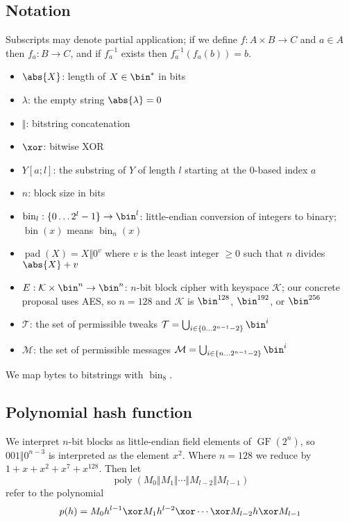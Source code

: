 \documentclass[letterpaper,11pt]{article}
\newcommand*{\Concat}{\Vert}
\DeclareMathOperator{\fromint}{bin}
\DeclareMathOperator{\GF}{GF}
\DeclareMathOperator{\pad}{pad}
\DeclareMathOperator{\poly}{poly}
\begin{document}
\subsection{Notation}
Subscripts may denote partial application; if we define $f: A \times B \rightarrow C$ and
$a \in A$ then $f_a: B \rightarrow C$, and if $f_a^{-1}$ exists then $f_a^{-1}(f_a(b)) = b$.
\begin{itemize}
    \item $\abs{X}$: length of $X \in \bin^{*}$ in bits
    \item $\lambda$: the empty string $\abs{\lambda} = 0$
    \item $\Concat$: bitstring concatenation
    \item \(\xor\): bitwise XOR
    \item $Y[a;l]$: the substring of $Y$ of length $l$ starting at the 0-based index $a$
    \item \(n\): block size in bits
    \item $\fromint_l: \{0 \ldots 2^l-1\} \rightarrow \bin^l$:
    little-endian conversion of integers to binary; 
    \(\fromint(x)\) means \(\fromint_n(x)\)
    \item $\pad(X) = X \Concat 0^v$
    where $v$ is the least integer $\geq 0$ such that $n$ divides $\abs{X} + v$
    \item \(E: \mathcal{K} \times \bin^n \rightarrow \bin^n\): 
    \(n\)-bit block cipher with keyspace \(\mathcal{K}\);
    our concrete proposal uses AES, so \(n=128\) and \(\mathcal{K}\) is
    \(\bin^{128}\), \(\bin^{192}\), or \(\bin^{256}\)
    \item \(\mathcal{T}\): the set of permissible tweaks
    \(\mathcal{T} = \bigcup_{i \in \{0\ldots2^{n-1}-2\}}\bin^i\)
    \item \(\mathcal{M}\): the set of permissible messages
    \(\mathcal{M} = \bigcup_{i \in \{n\ldots2^{n-1}-2\}}\bin^i\)
\end{itemize}
We map bytes to bitstrings with \(\fromint_8\).

\subsection{Polynomial hash function}
We interpret \(n\)-bit blocks as little-endian field elements of \(\GF(2^n)\),
so \(001 \Concat 0^{n-3}\) is interpreted as the element \(x^2\).
Where \(n=128\) we reduce by
\(1 + x + x^2 + x^7 + x^{128}\). Then let
\begin{displaymath}
    \poly(M_0 \Concat M_1 \Concat \cdots \Concat M_{l-2} \Concat M_{l-1})
\end{displaymath}
refer to the polynomial
\begin{displaymath}
    p(h) = M_0h^{l-1} \xor M_1h^{l-2} \xor \cdots \xor M_{l-2}h \xor M_{l-1}
\end{displaymath}
\end{document}
